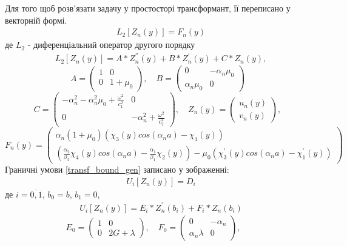Для того щоб розв'язати задачу у простосторі трансформант, її переписано у векторній формі.
\begin{align}\label{transf_mat_gen}
    &L_2\left[ Z_n(y) \right] = F_n(y)
\end{align}
де $L_2$ - диференціальний оператор другого порядку
\begin{align}
    &L_2\left[ Z_n(y) \right] = A * Z_n^{''}(y) + B * Z_n^{'}(y) + C * Z_n(y), 
\end{align}
\begin{equation*}
    A = \begin{pmatrix}
        1 & 0 \\
        0 & 1 + \mu_0
    \end{pmatrix}, \quad
    B = \begin{pmatrix}
        0 & -\alpha_n \mu_0 \\
        \alpha_n \mu_0 & 0
    \end{pmatrix}
\end{equation*}
\begin{equation*}
    C = \begin{pmatrix}
        -\alpha_n^2 -\alpha_n^2 \mu_0 + \frac{\omega^2}{c_1^2} & 0 \\
        0 & -\alpha_n^2 + \frac{\omega^2}{c_2^2}
    \end{pmatrix}, \quad
    Z_n(y) = \begin{pmatrix}
        u_n(y) \\
        v_n(y)
    \end{pmatrix},
\end{equation*}
\begin{equation*}
    F_n(y) = \begin{pmatrix}
        \alpha_n(1 + \mu_0)(\chi_3(y) cos(\alpha_n a) - \chi_1(y)) \\
        (\frac{\alpha_2}{\beta_2}\chi_4(y) cos(\alpha_n a) - \frac{\alpha_1}{\beta_1}\chi_2(y)) - \mu_0 (\chi_3^{'}(y) cos(\alpha_n a) -\chi_1^{'}(y))
    \end{pmatrix}
\end{equation*}
Граничні умови \eqref{transf_bound_gen} записано у зображенні:
\begin{align}\label{transf_bound_mat_gen}
    &U_i\left[ Z_n(y) \right] = D_i
\end{align}
де $i = \overline{0, 1}$, $b_0 = b$, $b_1 = 0$,
\begin{align}
    &U_i\left[ Z_n(y) \right] = E_i * Z_n^{'}(b_i) + F_i * Z_n(b_i)
\end{align}
\begin{equation*}
    E_0 = \begin{pmatrix}
        1 & 0 \\
        0 & 2G + \lambda
    \end{pmatrix}, \quad
    F_0 = \begin{pmatrix}
        0 & -\alpha_n \\
        \alpha_n \lambda & 0
    \end{pmatrix}, \quad
\end{equation*}
